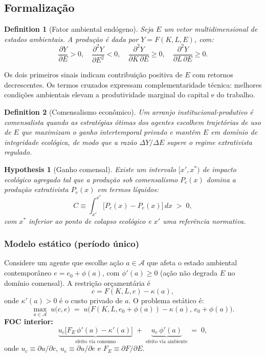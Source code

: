 \documentclass[a4paper,12pt,oneside,brazil,english]{abntex2}
\newtheorem{definition}{Definition}[section]
\newtheorem{hypothesis}{Hypothesis}[section]
\begin{document}


\subsection{Formalização}

\begin{definition}[Fator ambiental endógeno]
Seja $E$ um vetor multidimensional de estados ambientais. 
A produção é dada por $Y = F(K,L,E)$, com:
\[
\frac{\partial Y}{\partial E}>0,\quad 
\frac{\partial^2 Y}{\partial E^2}<0,\quad
\frac{\partial^2 Y}{\partial K \,\partial E}\ge 0,\quad 
\frac{\partial^2 Y}{\partial L \,\partial E}\ge 0.
\]
\end{definition}

\noindent
Os dois primeiros sinais indicam contribuição positiva de $E$ com retornos decrescentes. 
Os termos cruzados expressam complementaridade técnica: melhores condições ambientais elevam a produtividade marginal do capital e do trabalho.

\begin{definition}[Comensalismo econômico]
Um arranjo institucional-produtivo é \emph{comensalista} quando as estratégias ótimas dos agentes escolhem trajetórias de uso de $E$ que maximizam o ganho intertemporal privado \emph{e} mantêm $E$ em domínio de integridade ecológica, de modo que a razão $\Delta Y/\Delta E$ supere o regime extrativista regulado.
\end{definition}

\begin{hypothesis}[Ganho comensal]
Existe um intervalo $[x',x^*)$ de impacto ecológico agregado tal que a produção sob comensalismo $P_c(x)$ domina a produção extrativista $P_e(x)$ em termos líquidos:
\[
C \equiv \int_{x'}^{x^*}\!\!\big[P_c(x)-P_e(x)\big]\,dx \;>\; 0,
\]
com $x^*$ inferior ao ponto de colapso ecológico e $x'$ uma referência normativa.
\end{hypothesis}

\subsubsection*{Modelo estático (período único)}

Considere um agente que escolhe ação $a\in\mathcal{A}$ que afeta o estado ambiental contemporâneo $e = e_0 + \phi(a)$, com $\phi'(a)\ge 0$ (ação não degrada $E$ no domínio comensal). A restrição orçamentária é
\[
c = F(K,L,e) - \kappa(a),
\]
onde $\kappa'(a)>0$ é o custo privado de $a$. O problema estático é:
\[
\max_{a\in\mathcal{A}} \; u\big(c,e\big) \;=\; u\big(F(K,L,e_0+\phi(a))-\kappa(a),\, e_0+\phi(a)\big).
\]
\textbf{FOC interior:}
\[
\underbrace{u_c\big[F_E\,\phi'(a) - \kappa'(a)\big]}_{\text{efeito via consumo}}
\;+\;
\underbrace{u_e\,\phi'(a)}_{\text{efeito via ambiente}}
\;=\; 0,
\]
onde $u_c\equiv \partial u/\partial c$, $u_e\equiv \partial u/\partial e$ e $F_E\equiv \partial F/\partial E$.
\end{document}
